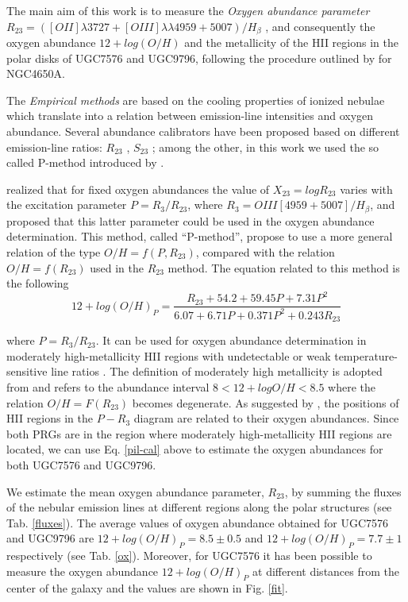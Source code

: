 \documentclass{aa}
\begin{document}
The main aim of this work is to measure the \emph{Oxygen abundance
  parameter} $R_{23} = ([OII]\lambda 3727 + [OIII]\lambda \lambda 4959
+ 5007)/H_{\beta}$ \citep{Pag79}, and consequently the oxygen
abundance $12+log(O/H)$ and the metallicity of the HII regions in the
polar disks of UGC7576 and UGC9796, following the procedure outlined
by \cite{Spav10} for NGC4650A.

The \emph{Empirical methods} are based on the cooling properties of
ionized nebulae which translate into a relation between emission-line
intensities and oxygen abundance. Several abundance calibrators have
been proposed based on different emission-line ratios: $R_{23}$
\citep{Pag79}, $S_{23}$ \citep{Diaz00}; among the other, in this work
we used the so called P-method introduced by \cite{Pil01}.

\cite{Pil01} realized that for fixed oxygen abundances the value
of $X_{23} = log R_{23}$ varies with the excitation parameter $P =
R_{3}/R_{23}$, where $R_{3} = OIII[4959+5007]/H_{\beta}$, and proposed
that this latter parameter could be used in the oxygen abundance
determination. This method, called ``P-method'', propose to use a more
general relation of the type $O/H = f(P, R_{23})$, compared with the
relation $O/H = f(R_{23})$ used in the $R_{23}$ method. The equation
related to this method is the following
\begin{equation}\label{pil-cal}
    12+log(O/H)_{P} = \frac{R_{23}+54.2+59.45P+7.31P^{2}}{6.07+6.71P+0.371P^{2}+0.243R_{23}}
\end{equation}

where $P = R_{3}/R_{23}$. It can be used for oxygen abundance
determination in moderately high-metallicity HII regions with
undetectable or weak temperature-sensitive line ratios
\cite{Pil01}. The definition of moderately high metallicity is
  adopted from \citet{Pil01} and refers to the abundance interval $8 <
  12+logO/H < 8.5$ where the relation $O/H = F(R_{23})$ \citep{Pag79}
  becomes degenerate. As suggested by \citet{Pil01}, the positions of
  HII regions in the $P-R_{3}$ diagram are related to their oxygen
  abundances. Since both PRGs are in the region where moderately
  high-metallicity HII regions are located, we can use
  Eq. \ref{pil-cal} above to estimate the oxygen abundances for both
  UGC7576 and UGC9796.

We estimate the mean oxygen abundance parameter, $R_{23}$, by
  summing the fluxes of the nebular emission lines at different
  regions along the polar structures (see Tab. \ref{fluxes}). The
average values of oxygen abundance obtained for UGC7576 and UGC9796
are $12+log(O/H)_{P} = 8.5 \pm 0.5$ and $12+log(O/H)_{P} = 7.7 \pm 1$
respectively (see Tab. \ref{ox}). Moreover, for UGC7576 it has been
possible to measure the oxygen abundance $12+log(O/H)_{P}$ at
different distances from the center of the galaxy and the values are
shown in Fig. \ref{fit}.
\end{document}
